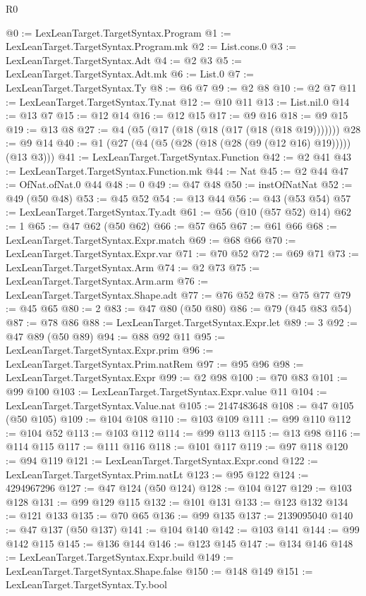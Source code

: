 \begin{lexlean}{R0}
\begin{coremodule}
@0 := LexLeanTarget.TargetSyntax.Program
@1 := LexLeanTarget.TargetSyntax.Program.mk
@2 := List.cons.{0}
@3 := LexLeanTarget.TargetSyntax.Adt
@4 := @2 @3
@5 := LexLeanTarget.TargetSyntax.Adt.mk
@6 := List.{0}
@7 := LexLeanTarget.TargetSyntax.Ty
@8 := @6 @7
@9 := @2 @8
@10 := @2 @7
@11 := LexLeanTarget.TargetSyntax.Ty.nat
@12 := @10 @11
@13 := List.nil.{0}
@14 := @13 @7
@15 := @12 @14
@16 := @12 @15
@17 := @9 @16
@18 := @9 @15
@19 := @13 @8
@27 := @4 (@5 (@17 (@18 (@18 (@17 (@18 (@18 @19)))))))
@28 := @9 @14
@40 := @1 (@27 (@4 (@5 (@28 (@18 (@28 (@9 (@12 @16) @19))))) (@13 @3)))
@41 := LexLeanTarget.TargetSyntax.Function
@42 := @2 @41
@43 := LexLeanTarget.TargetSyntax.Function.mk
@44 := Nat
@45 := @2 @44
@47 := OfNat.ofNat.{0} @44
@48 := 0
@49 := @47 @48
@50 := instOfNatNat
@52 := @49 (@50 @48)
@53 := @45 @52
@54 := @13 @44
@56 := @43 (@53 @54)
@57 := LexLeanTarget.TargetSyntax.Ty.adt
@61 := @56 (@10 (@57 @52) @14)
@62 := 1
@65 := @47 @62 (@50 @62)
@66 := @57 @65
@67 := @61 @66
@68 := LexLeanTarget.TargetSyntax.Expr.match
@69 := @68 @66
@70 := LexLeanTarget.TargetSyntax.Expr.var
@71 := @70 @52
@72 := @69 @71
@73 := LexLeanTarget.TargetSyntax.Arm
@74 := @2 @73
@75 := LexLeanTarget.TargetSyntax.Arm.arm
@76 := LexLeanTarget.TargetSyntax.Shape.adt
@77 := @76 @52
@78 := @75 @77
@79 := @45 @65
@80 := 2
@83 := @47 @80 (@50 @80)
@86 := @79 (@45 @83 @54)
@87 := @78 @86
@88 := LexLeanTarget.TargetSyntax.Expr.let
@89 := 3
@92 := @47 @89 (@50 @89)
@94 := @88 @92 @11
@95 := LexLeanTarget.TargetSyntax.Expr.prim
@96 := LexLeanTarget.TargetSyntax.Prim.natRem
@97 := @95 @96
@98 := LexLeanTarget.TargetSyntax.Expr
@99 := @2 @98
@100 := @70 @83
@101 := @99 @100
@103 := LexLeanTarget.TargetSyntax.Expr.value @11
@104 := LexLeanTarget.TargetSyntax.Value.nat
@105 := 2147483648
@108 := @47 @105 (@50 @105)
@109 := @104 @108
@110 := @103 @109
@111 := @99 @110
@112 := @104 @52
@113 := @103 @112
@114 := @99 @113
@115 := @13 @98
@116 := @114 @115
@117 := @111 @116
@118 := @101 @117
@119 := @97 @118
@120 := @94 @119
@121 := LexLeanTarget.TargetSyntax.Expr.cond
@122 := LexLeanTarget.TargetSyntax.Prim.natLt
@123 := @95 @122
@124 := 4294967296
@127 := @47 @124 (@50 @124)
@128 := @104 @127
@129 := @103 @128
@131 := @99 @129 @115
@132 := @101 @131
@133 := @123 @132
@134 := @121 @133
@135 := @70 @65
@136 := @99 @135
@137 := 2139095040
@140 := @47 @137 (@50 @137)
@141 := @104 @140
@142 := @103 @141
@144 := @99 @142 @115
@145 := @136 @144
@146 := @123 @145
@147 := @134 @146
@148 := LexLeanTarget.TargetSyntax.Expr.build
@149 := LexLeanTarget.TargetSyntax.Shape.false
@150 := @148 @149
@151 := LexLeanTarget.TargetSyntax.Ty.bool

\end{coremodule}
\end{lexlean}
